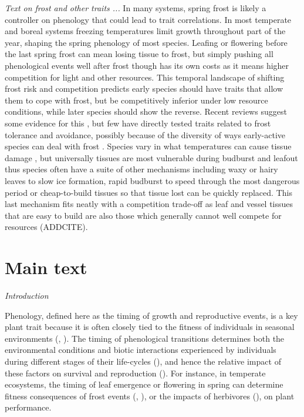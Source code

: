 \documentclass[11pt]{article}
\begin{document}
\emph{Text on frost and other traits ...} 
In many systems, spring frost is likely a controller on phenology that could lead to trait correlations. In most temperate and boreal systems freezing temperatures limit growth throughout part of the year, shaping the spring phenology of most species. Leafing or flowering before the last spring frost can mean losing tissue to frost, but simply pushing all phenological events well after frost though has its own costs as it means higher competition for light and other resources. This temporal landscape of shifting frost risk and competition predicts early species should have traits that allow them to cope with frost, but be competitively inferior under low resource conditions, while later species should show the reverse. Recent reviews suggest some evidence for this \citep{wolkovich2014aob,memegan2021}, but few have directly tested traits related to frost tolerance and avoidance, possibly because of the diversity of ways early-active species can deal with frost \citep{frostbook}. Species vary in what temperatures can cause tissue damage \citep{Lenz2013}, but universally tissues are most vulnerable during budburst and leafout \citep{frostbook,cat2019} thus species often have a suite of other mechanisms including waxy or hairy leaves to slow ice formation, rapid budburst to speed through the most dangerous period or cheap-to-build tissues so that tissue lost can be quickly replaced. This last mechanism fits neatly with a competition trade-off as leaf and vessel tissues that are easy to build are also those which generally cannot well compete for resources (ADDCITE). %

\section{Main text}

\emph{Introduction} 

Phenology, defined here as the timing of growth and reproductive events, is a key plant trait because it is often closely tied to the fitness of individuals in seasonal environments (\citet{verdu2005early}, \citet{munguia2011meta}). The timing of phenological transitions determines both the environmental conditions and biotic interactions experienced by individuals during different stages of their life-cycles (\citet{donohue2005niche}), and hence the relative impact of these factors on survival and reproduction (\citet{caruso2019meta}). For instance, in temperate ecosystems, the timing of leaf emergence or flowering in spring can determine fitness consequences of frost events (\citet{inouye2008effects}, \citet{augspurger2013reconstructing}), or the impacts of herbivores (\citet{meineke2021phenological}), on plant performance.
\end{document}
